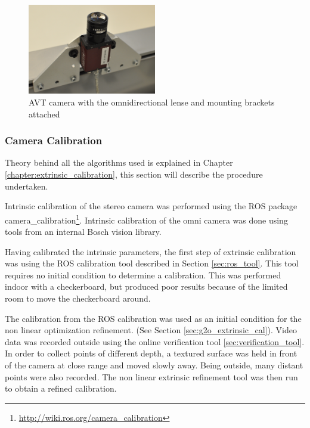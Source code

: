 
\begin{figure}[h]
  \centering
    \includegraphics[width=0.5\textwidth]{chapters/images/omni_cam_image}
  \caption{AVT camera with the omnidirectional lense and mounting brackets attached}
\end{figure}

\subsubsection{Camera Calibration}
\label{subsubsec:actual_calibation}

Theory behind all the algorithms used is explained in Chapter \ref{chapter:extrinsic_calibration}, this section will describe the procedure undertaken.  

Intrinsic calibration of the stereo camera was performed using the ROS package camera\_calibration\footnote{\url{http://wiki.ros.org/camera_calibration}}.  Intrinsic calibration of the omni camera was done using tools from an internal Bosch vision library.

Having calibrated the intrinsic parameters, the first step of extrinsic calibration was using the ROS calibration tool described in Section \ref{sec:ros_tool}.  This tool requires no initial condition to determine a calibration.  This was performed indoor with a checkerboard, but produced poor results because of the limited room to move the checkerboard around.

The calibration from the ROS calibration was used as an initial condition for the non linear optimization refinement. (See Section \ref{sec:g2o_extrinsic_cal}).  Video data was recorded outside using the online verification tool \ref{sec:verification_tool}.  In order to collect points of different depth, a textured surface was held in front of the camera at close range and moved slowly away.  Being outside, many distant points were also recorded.  The non linear extrinsic refinement tool was then run to obtain a refined calibration.   

